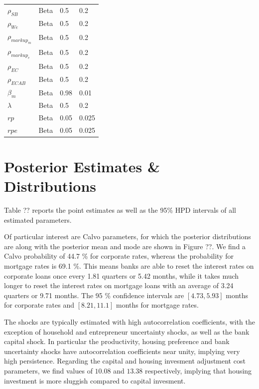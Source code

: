\documentclass[12pt]{article}
\numberwithin{equation}{section}
\begin{document}
\begin{table}[H]
\begin{tabular}{l|l|l|l}
$\rho_{SB}$ & Beta & 0.5 & 0.2 \\
$\rho_{We}$ & Beta & 0.5 & 0.2 \\
$\rho_{markup_m}$ & Beta & 0.5 & 0.2 \\
$\rho_{markup_e}$ & Beta & 0.5 & 0.2 \\
$\rho_{EC}$ & Beta & 0.5 & 0.2 \\
$\rho_{ECAB}$ & Beta & 0.5 & 0.2 \\
$\beta_m$ 	  &   Beta   &  0.98   & 0.01    \\
$\lambda$ 	  &  Beta    &   0.5  &   0.2  \\
$rp$ 	  &   Beta   &   0.05  &   0.025  \\
$rpe$ 	  &   Beta   &   0.05  &   0.025  \\
\end{tabular}
\end{table}

\section*{Posterior Estimates \& Distributions}

Table ?? reports the point estimates as well as the 95\% HPD intervals of all estimated parameters.

Of particular interest are Calvo parameters, for which the posterior distributions are along with the posterior mean and mode are shown in Figure ??. We find a Calvo probability of 44.7 \% for corporate rates, whereas the probability for mortgage rates is 69.1 \%. This means banks are able to reset the interest rates on corporate loans once every 1.81 quarters or 5.42 months, while it takes much longer to reset the interest rates on mortgage loans with an average of 3.24 quarters or 9.71 months. The 95 \% confidence intervals are $[4.73,5.93]$ months for corporate rates and $[8.21,11.1]$ months for mortgage rates.

The shocks are typically estimated with high autocorrelation coefficients, with the exception of household and entrepreneur uncertainty shocks, as well as the bank capital shock. In particular the productivity, housing preference and bank uncertainty shocks have autocorrelation coefficients near unity, implying very high persistence. Regarding the capital and housing invesment adjustment cost parameters, we find values of $10.08$ and $13.38$ respectively, implying that housing investment is more sluggish compared to capital invesment. 
\end{document}
